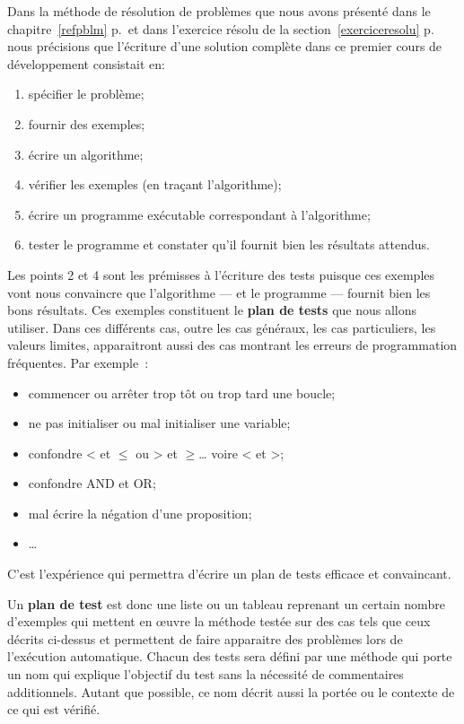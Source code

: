 Dans la méthode de résolution de problèmes que nous avons présenté dans le
chapitre~\ref{refpblm} p.\,\pageref{refpblm} et dans l'exercice résolu de la
section~\ref{exerciceresolu} p.\,\pageref{exerciceresolu} nous précisions que
l'écriture d'une solution complète dans ce premier cours de développement
consistait en: 

\begin{enumerate}
	\item spécifier le problème;
	\item fournir des exemples;
	\item écrire un algorithme;
	\item vérifier les exemples (en traçant l'algorithme);
	\item écrire un programme exécutable correspondant à l'algorithme;
	\item tester le programme et constater qu'il fournit bien les résultats attendus.
\end{enumerate}

Les points 2 et 4 sont les prémisses à l'écriture des tests puisque ces exemples
vont nous convaincre que l'algorithme --- et le programme --- fournit bien les
\og{}bons\fg{} résultats. Ces exemples constituent le \textbf{plan de tests} que nous allons utiliser. Dans ces différents cas, outre les cas généraux, les cas particuliers, les valeurs limites, apparaitront aussi des cas montrant les erreurs de programmation fréquentes. Par exemple~:

\begin{itemize}
	\item commencer ou arrêter trop tôt ou trop tard une boucle;
	\item ne pas initialiser ou mal initialiser une variable;
	\item confondre < et $\le$ ou > et $\ge$… voire < et >;
	\item confondre AND et OR;
	\item mal écrire la négation d'une proposition;
	\item \dots
\end{itemize}

C'est l'expérience qui permettra d'écrire un plan de tests efficace et
convaincant.

Un \textbf{plan de test} est donc une liste ou un tableau
reprenant un certain nombre d'exemples qui mettent en œuvre la méthode testée
sur des cas tels que ceux décrits ci-dessus et permettent de faire apparaitre
des problèmes lors de l'exécution automatique. Chacun des tests sera défini par
une méthode qui porte un nom qui explique l'objectif du test sans la nécessité
de commentaires additionnels. Autant que possible, ce nom décrit aussi la
portée ou le contexte de ce qui est vérifié.

